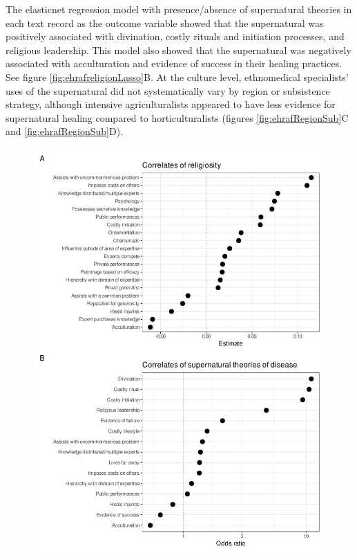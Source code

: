 \documentclass[
  11pt,
]{article}
\begin{document}
The elasticnet regression model with presence/absence of supernatural theories in each text record as the outcome variable showed that the supernatural was positively associated with divination, costly rituals and initiation processes, and religious leadership. This model also showed that the supernatural was negatively associated with acculturation and evidence of success in their healing practices. See figure \ref{fig:ehrafreligionLasso}B. At the culture level, ethnomedical specialists' uses of the supernatural did not systematically vary by region or subsistence strategy, although intensive agriculturalists appeared to have less evidence for supernatural healing compared to horticulturalists (figures \ref{fig:ehrafRegionSub}C and \ref{fig:ehrafRegionSub}D).

\begin{landscape}


\begin{figure}[p]

{\centering \includegraphics{magic-healers-article2_files/figure-latex/ehrafreligionLasso-1} 

}
\end{figure}
\end{landscape}
\end{document}
